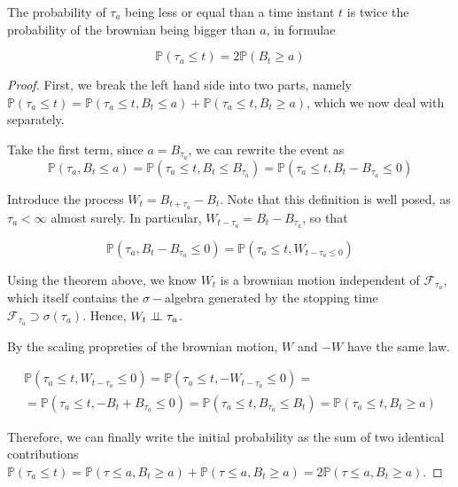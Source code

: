 \begin{theorem}
    The probability of $\tau_a$ being less or equal than a time instant $t$ is twice the probability of the brownian being bigger than $a$, in formulae

    \begin{equation}
        \mathbb{P}(\tau_a \leq t ) = 2\mathbb{P}(B_t \geq a)
    \end{equation}
\end{theorem}
\begin{proof}
    First, we break the left hand side into two parts, namely $\mathbb{P}(\tau_a \leq t) = \mathbb{P}(\tau_a \leq t, B_t \leq a) + \mathbb{P}(\tau_a \leq t, B_t \geq a)$, which we now deal with separately. 

    Take the first term, since $a = B_{\tau_a}$, we can rewrite the event as
    \begin{equation*}
        \mathbb{P}(\tau_a, B_t \leq a) = \mathbb{P}(\tau_a \leq t, B_t \leq B_{\tau_a} ) = \mathbb{P}(\tau_a \leq t, B_t - B_{\tau_a} \leq 0)
    \end{equation*}

    Introduce the process $W_{t} = B_{t+\tau_a}-B_t$. Note that this definition is well posed, as $\tau_a < \infty$ almost surely. In particular, $W_{t-\tau_a} = B_{t}-B_{\tau_a}$, so that

    \begin{equation*}
        \mathbb{P}(\tau_a, B_t - B_{\tau_a} \leq 0) = \mathbb{P}(\tau_a \leq t, W_{t-\tau_a \leq 0})
    \end{equation*}

    Using the theorem above, we know $W_{t}$ is a brownian motion independent of $\mathcal{F}_{\tau_a}$, which itself contains the $\sigma-$algebra generated by the stopping time $\mathcal{F}_{\tau_a} \supset \sigma(\tau_a)$. Hence, $W_t \perp \!\!\! \perp \tau_a$. 

    By the scaling propreties of the brownian motion, $W$ and $-W$ have the same law.

    \begin{gather*}
        \mathbb{P}(\tau_a \leq t, W_{t-\tau_a} \leq 0) = \mathbb{P}(\tau_a \leq t, -W_{t-\tau_a} \leq 0) = \\
        = \mathbb{P}(\tau_a \leq t, -B_t + B_{\tau_a} \leq 0) = \mathbb{P}(\tau_a \leq t, B_{\tau_a} \leq B_t) = \mathbb{P}(\tau_a \leq t, B_t \geq a)
    \end{gather*}

    Therefore, we can finally write the initial probability as the sum of two identical contributions $\mathbb{P}(\tau_a \leq t) = \mathbb{P}(\tau \leq a, B_t \geq a)+\mathbb{P}(\tau \leq a, B_t \geq a) = 2\mathbb{P}(\tau \leq a, B_t \geq a)$. 
\end{proof}

